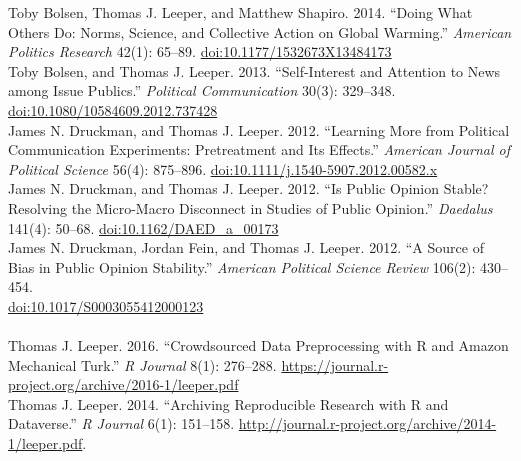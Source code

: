 \documentclass[12pt]{article}
\newcommand{\topic}[1]{\pagebreak[3]\indent {\color{lg}{\footnotesize #1 }}\\}
\newcommand{\entry}[1]{\indent {\color{lg}\guillemotright}\hspace{2pt}#1\vspace{.25em}\\}
\begin{document}
	\entry{Toby Bolsen, Thomas J. Leeper, and Matthew Shapiro. 2014. ``Doing What Others Do: Norms, Science, and Collective Action on Global Warming.'' \textit{American Politics Research} 42(1): 65--89. \href{http://doi.org/10.1177/1532673X13484173}{doi:10.1177/1532673X13484173}}
	\entry{Toby Bolsen, and Thomas J. Leeper. 2013. ``Self-Interest and Attention to News among Issue Publics.'' \textit{Political Communication} 30(3): 329--348.\\ \href{http://doi.org/10.1080/10584609.2012.737428}{doi:10.1080/10584609.2012.737428}}
	\entry{James N. Druckman, and Thomas J. Leeper. 2012. ``Learning More from Political Communication Experiments: Pretreatment and Its Effects.'' \textit{American Journal of Political Science} 56(4): 875--896. \href{http://doi.org/10.1111/j.1540-5907.2012.00582.x}{doi:10.1111/j.1540-5907.2012.00582.x}}
	\entry{James N. Druckman, and Thomas J. Leeper. 2012. ``Is Public Opinion Stable? Resolving the Micro-Macro Disconnect in Studies of Public Opinion.'' \textit{Daedalus} 141(4): 50--68. \href{http://doi.org/10.1162/DAED\_a\_00173}{doi:10.1162/DAED\_a\_00173}}
	\entry{James N. Druckman, Jordan Fein, and Thomas J. Leeper. 2012. ``A Source of Bias in Public Opinion Stability.'' \textit{American Political Science Review} 106(2): 430--454.\\ \href{http://doi.org/10.1017/S0003055412000123}{doi:10.1017/S0003055412000123}}

\topic{Peer-Reviewed Publications: Software}
	\entry{Thomas J. Leeper. 2016. ``Crowdsourced Data Preprocessing with R and Amazon Mechanical Turk.'' \textit{R Journal} 8(1): 276--288. \href{https://journal.r-project.org/archive/2016-1/leeper.pdf}{https://journal.r-project.org/archive/2016-1/leeper.pdf}}
	\entry{Thomas J. Leeper. 2014. ``Archiving Reproducible Research with R and Dataverse.'' \textit{R Journal} 6(1): 151--158. \href{http://journal.r-project.org/archive/2014-1/leeper.pdf}{http://journal.r-project.org/archive/2014-1/leeper.pdf}.}
\end{document}
